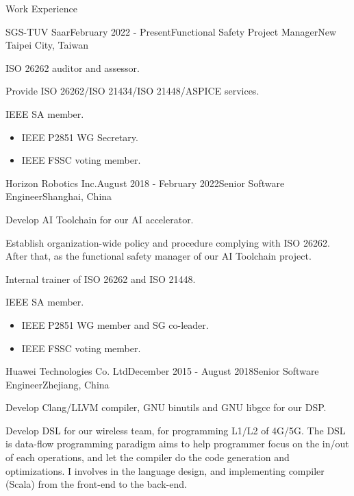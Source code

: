 \documentclass{resume} %
\begin{document}
\begin{rSection}{Work Experience}

\begin{rSubsection}{SGS-TUV Saar}{February 2022 - Present}{Functional Safety Project Manager}{New Taipei City, Taiwan}
\item ISO 26262 auditor and assessor.
\item Provide ISO 26262/ISO 21434/ISO 21448/ASPICE services.
\item IEEE SA member.
\begin{itemize}
\item IEEE P2851 WG Secretary.
\item IEEE FSSC voting member.
\end{itemize}
\end{rSubsection}

\begin{rSubsection}{Horizon Robotics Inc.}{August 2018 - February 2022}{Senior Software Engineer}{Shanghai, China}
\item Develop AI Toolchain for our AI accelerator.
\item Establish organization-wide policy and procedure complying with ISO 26262. After that, as the functional safety manager of our AI Toolchain project.
\item Internal trainer of ISO 26262 and ISO 21448.
\item IEEE SA member.
\begin{itemize}
\item IEEE P2851 WG member and SG co-leader.
\item IEEE FSSC voting member.
\end{itemize}
\end{rSubsection}


\begin{rSubsection}{Huawei Technologies Co. Ltd}{December 2015 - August 2018}{Senior Software Engineer}{Zhejiang, China}
\item Develop Clang/LLVM compiler, GNU binutils and GNU libgcc for our DSP.
\item Develop DSL for our wireless team, for programming L1/L2 of 4G/5G. The DSL is data-flow programming paradigm aims to help programmer focus on the in/out of each operations, and let the compiler do the code generation and optimizations. I involves in the language design, and implementing compiler (Scala) from the front-end to the back-end.
\end{rSubsection}


\end{rSection}
\end{document}
